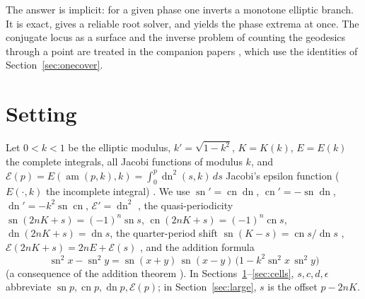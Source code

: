 \documentclass[11pt]{article}
\theoremstyle{remark}
\newcommand{\sn}{\operatorname{sn}}
\newcommand{\cn}{\operatorname{cn}}
\newcommand{\dn}{\operatorname{dn}}
\newcommand{\am}{\operatorname{am}}
\newcommand{\epsi}{\mathcal{E}}
\begin{document}
The answer is implicit: for a given phase one inverts a monotone elliptic
branch.  It is exact, gives a reliable root solver, and yields the phase
extrema at once.  The conjugate locus as a surface and the inverse problem
of counting the geodesics through a point are treated in the companion
papers \cite{SE2FirstCaustic,SE2Counts}, which use the identities of
Section~\ref{sec:onecover}.

\section{Setting}\label{sec:setting}

Let $0<k<1$ be the elliptic modulus, $k'=\sqrt{1-k^2}$, $K=K(k)$,
$E=E(k)$ the complete integrals, all Jacobi functions of modulus $k$, and
$\epsi(p)=E(\am(p,k),k)=\int_0^p\dn^2(s,k)\,ds$ Jacobi's epsilon function
($E(\cdot,k)$ the incomplete integral)
\cite[\S22.16(ii)]{DLMF}.  We use
$\sn'=\cn\dn$, $\cn'=-\sn\dn$, $\dn'=-k^2\sn\cn$, $\epsi'=\dn^2$
\cite[\S22.13(i), \S22.16(ii)]{DLMF}, the quasi-periodicity
$\sn(2nK+s)=(-1)^n\sn s$, $\cn(2nK+s)=(-1)^n\cn s$, $\dn(2nK+s)=\dn s$,
the quarter-period shift $\sn(K-s)=\cn s/\dn s$ \cite[\S22.4]{DLMF},
$\epsi(2nK+s)=2nE+\epsi(s)$ \cite[\S22.16(ii)]{DLMF}, and the addition formula
\begin{equation}\label{eq:sn-addition}
 \sn^2x-\sn^2y=\sn(x+y)\,\sn(x-y)\,\bigl(1-k^2\sn^2x\,\sn^2y\bigr)
\end{equation}
(a consequence of the addition theorem \cite[\S22.8]{DLMF}).  In
Sections~\ref{sec:setting}--\ref{sec:cells},
$s,c,d,\epsilon$ abbreviate $\sn p,\cn p,\dn p,\epsi(p)$; in
Section~\ref{sec:large}, $s$ is the offset $p-2nK$.
\end{document}
